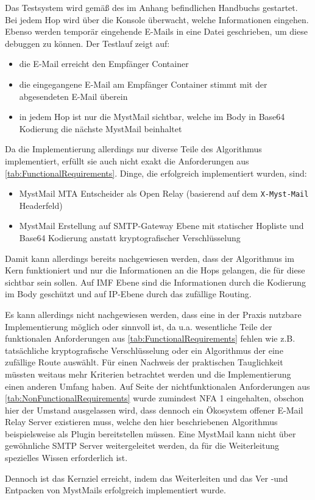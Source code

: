 Das Testsystem wird gemäß des im Anhang befindlichen Handbuchs gestartet. Bei jedem Hop wird über die Konsole überwacht, welche Informationen eingehen. Ebenso werden temporär eingehende E-Mails in eine Datei geschrieben, um diese debuggen zu können.
Der Testlauf zeigt auf:
\begin{itemize}
\item die E-Mail erreicht den Empfänger Container
\item die eingegangene E-Mail am Empfänger Container stimmt mit der abgesendeten E-Mail überein
\item in jedem Hop ist nur die MystMail sichtbar, welche im Body in Base64 Kodierung die nächste MystMail beinhaltet
\end{itemize}

Da die Implementierung allerdings nur diverse Teile des Algorithmus implementiert, erfüllt sie auch nicht exakt die Anforderungen aus \autoref{tab:FunctionalRequirements}. Dinge, die erfolgreich implementiert wurden, sind:
\begin{itemize}
\item MystMail MTA Entscheider als Open Relay (basierend auf dem \verb#X-Myst-Mail# Headerfeld)
\item MystMail Erstellung auf SMTP-Gateway Ebene mit statischer Hopliste und Base64 Kodierung anstatt kryptografischer Verschlüsselung
\end{itemize}

Damit kann allerdings bereits nachgewiesen werden, dass der Algorithmus im Kern funktioniert und nur die Informationen an die Hops gelangen, die für diese sichtbar sein sollen. Auf IMF Ebene sind die Informationen durch die Kodierung im Body geschützt und auf IP-Ebene durch das zufällige Routing.

Es kann allerdings nicht nachgewiesen werden, dass eine in der Praxis nutzbare Implementierung möglich oder sinnvoll ist, da u.a. wesentliche Teile der funktionalen Anforderungen aus \autoref{tab:FunctionalRequirements} fehlen wie z.B. tatsächliche kryptografische Verschlüsselung oder ein Algorithmus der eine zufällige Route auswählt. Für einen Nachweis der praktischen Tauglichkeit müssten weitaus mehr Kriterien betrachtet werden und die Implementierung einen anderen Umfang haben. Auf Seite der nichtfunktionalen Anforderungen aus \autoref{tab:NonFunctionalRequirements} wurde zumindest NFA 1 eingehalten, obschon hier der Umstand ausgelassen wird, dass dennoch ein Ökosystem offener E-Mail Relay Server existieren muss, welche den hier beschriebenen Algorithmus beispielsweise als Plugin bereitstellen müssen. Eine MystMail kann nicht über gewöhnliche SMTP Server weitergeleitet werden, da für die Weiterleitung spezielles Wissen erforderlich ist.

Dennoch ist das Kernziel erreicht, indem das Weiterleiten und das Ver -und Entpacken von MystMails erfolgreich implementiert wurde.

